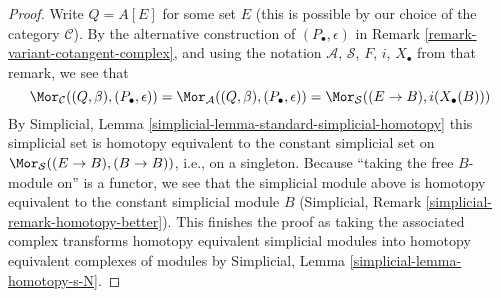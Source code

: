 \begin{proof}
\medskip\noindent
Write $Q = A[E]$ for some set $E$ (this is possible by our choice of
the category $\mathcal{C}$). By the alternative construction of
$(P_\bullet, \epsilon)$
in Remark \ref{remark-variant-cotangent-complex}, and using the notation
$\mathcal{A}$, $\mathcal{S}$, $F$, $i$, $X_\bullet$ from that remark,
we see that
$$
\Mor_\mathcal{C}((Q, \beta), (P_\bullet, \epsilon)) =
\Mor_{\mathcal{A}}((Q, \beta), (P_\bullet, \epsilon)) = 
\Mor_{\mathcal{S}}((E \to B), i(X_\bullet(B)))
$$
By Simplicial, Lemma \ref{simplicial-lemma-standard-simplicial-homotopy}
this simplicial set is homotopy equivalent to the constant simplicial set on
$\Mor_\mathcal{S}((E \to B), (B \to B))$, i.e., on a singleton.
Because ``taking the free $B$-module on'' is a functor, we
see that the simplicial module above is homotopy equivalent
to the constant simplicial module $B$
(Simplicial, Remark \ref{simplicial-remark-homotopy-better}).
This finishes the proof as taking the associated complex transforms
homotopy equivalent simplicial modules into homotopy equivalent
complexes of modules by Simplicial, Lemma \ref{simplicial-lemma-homotopy-s-N}.
\end{proof}
















